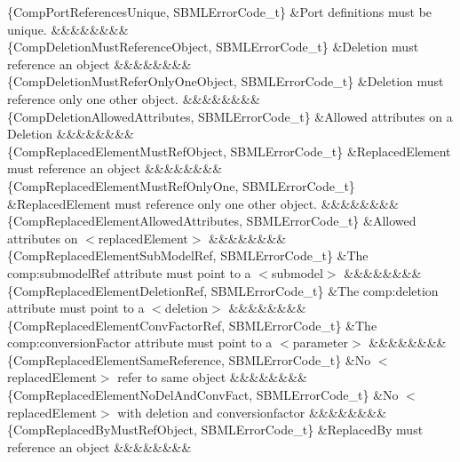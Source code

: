 \begin{DoxyParagraph}{}
\begin{longtabu}
\{Comp\+Port\+References\+Unique, S\+B\+M\+L\+Error\+Code\+\_\+t\} &Port definitions must be unique. &&&&&&&&\\
\{Comp\+Deletion\+Must\+Reference\+Object, S\+B\+M\+L\+Error\+Code\+\_\+t\} &Deletion must reference an object &&&&&&&&\\
\{Comp\+Deletion\+Must\+Refer\+Only\+One\+Object, S\+B\+M\+L\+Error\+Code\+\_\+t\} &Deletion must reference only one other object. &&&&&&&&\\
\{Comp\+Deletion\+Allowed\+Attributes, S\+B\+M\+L\+Error\+Code\+\_\+t\} &Allowed attributes on a Deletion &&&&&&&&\\
\{Comp\+Replaced\+Element\+Must\+Ref\+Object, S\+B\+M\+L\+Error\+Code\+\_\+t\} &Replaced\+Element must reference an object &&&&&&&&\\
\{Comp\+Replaced\+Element\+Must\+Ref\+Only\+One, S\+B\+M\+L\+Error\+Code\+\_\+t\} &Replaced\+Element must reference only one other object. &&&&&&&&\\
\{Comp\+Replaced\+Element\+Allowed\+Attributes, S\+B\+M\+L\+Error\+Code\+\_\+t\} &Allowed attributes on {\ttfamily $<$replaced\+Element$>$} &&&&&&&&\\
\{Comp\+Replaced\+Element\+Sub\+Model\+Ref, S\+B\+M\+L\+Error\+Code\+\_\+t\} &The \textquotesingle{}comp\+:submodel\+Ref\textquotesingle{} attribute must point to a {\ttfamily $<$submodel$>$} &&&&&&&&\\
\{Comp\+Replaced\+Element\+Deletion\+Ref, S\+B\+M\+L\+Error\+Code\+\_\+t\} &The \textquotesingle{}comp\+:deletion\textquotesingle{} attribute must point to a {\ttfamily $<$deletion$>$} &&&&&&&&\\
\{Comp\+Replaced\+Element\+Conv\+Factor\+Ref, S\+B\+M\+L\+Error\+Code\+\_\+t\} &The \textquotesingle{}comp\+:conversion\+Factor attribute must point to a {\ttfamily $<$parameter$>$} &&&&&&&&\\
\{Comp\+Replaced\+Element\+Same\+Reference, S\+B\+M\+L\+Error\+Code\+\_\+t\} &No {\ttfamily $<$replaced\+Element$>$} refer to same object &&&&&&&&\\
\{Comp\+Replaced\+Element\+No\+Del\+And\+Conv\+Fact, S\+B\+M\+L\+Error\+Code\+\_\+t\} &No {\ttfamily $<$replaced\+Element$>$} with deletion and conversionfactor &&&&&&&&\\
\{Comp\+Replaced\+By\+Must\+Ref\+Object, S\+B\+M\+L\+Error\+Code\+\_\+t\} &Replaced\+By must reference an object &&&&&&&&\\

\end{longtabu}
\end{DoxyParagraph}
